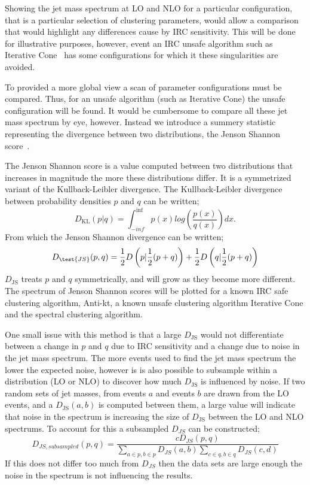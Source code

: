 Showing the jet mass spectrum at LO and NLO for a particular configuration,
that is a particular selection of clustering parameters,
would allow a comparison that would highlight any differences cause by IRC sensitivity.
This will be done for illustrative purposes,
however, event an IRC unsafe algorithm such as Iterative Cone~\cite{cacciari_antikt2018}
 has some configurations for which it these singularities are avoided.

To provided a more global view a scan of parameter configurations must be compared.
Thus, for an unsafe algorithm (such as Iterative Cone) the unsafe configuration
will be found.
It would be cumbersome to compare all these jet mass spectrum by eye, however.
Instead we introduce a summery statistic representing the divergence between two distributions,
the Jenson Shannon score~\cite{jensen_shannon}.

The Jenson Shannon score is a value computed between two distributions that increases in magnitude the more these distributions differ.
It is a symmetrized variant of the Kullback-Leibler divergence.
The Kullback-Leibler divergence between probability densities \(p\) and \(q\) can be written;
\[D_\text{KL} (p | q) = \int^{\inf}_{-inf} p(x) log\left(\frac{p(x)}{q(x)}\right) dx.\]
From which the Jenson Shannon divergence can be written;
\[D_\test{JS}(p, q) = \frac{1}{2}D\left(p | \frac{1}{2}(p + q)\right) + \frac{1}{2}D\left(q | \frac{1}{2}(p + q)\right)\]
\(D_\text{JS}\) treats \(p\) and \(q\) symmetrically, and will grow as they become more different.
The spectrum of Jenson Shannon scores will be plotted for a known IRC safe clustering algorithm, Anti-kt,
a known unsafe clustering algorithm Iterative Cone and the spectral clustering algorithm.

One small issue with this method is that a large \(D_\text{JS}\) would not differentiate
between a change in \(p\) and \(q\) due to IRC sensitivity and 
a change due to noise in the jet mass spectrum.
The more events used to find the jet mass spectrum the lower the expected noise,
however is is also possible to subsample within a distribution (LO or NLO)
to discover how much \(D_\text{JS}\) is influenced by noise.
If two random sets of jet masses, from events \(a\) and events \(b\) are drawn from the LO events,
and a \(D_\text{JS}(a, b)\) is computed between them, a large value will indicate that 
noise in the spectrum is increasing the size of \(D_\text{JS}\) between the LO and NLO spectrums.
To account for this a subsampled \(D_{JS}\) can be constructed;
\[D_{JS, subsampled}(p, q) = \frac{cD_{JS}(p, q)}{\sum_{a \in p, b \in p} D_{JS}(a, b)\sum_{c \in q, b \in q} D_{JS}(c, d)}\]
If this does not differ too much from \(D_{JS}\) then the data sets are large enough the noise in
the spectrum is not influencing the results.
